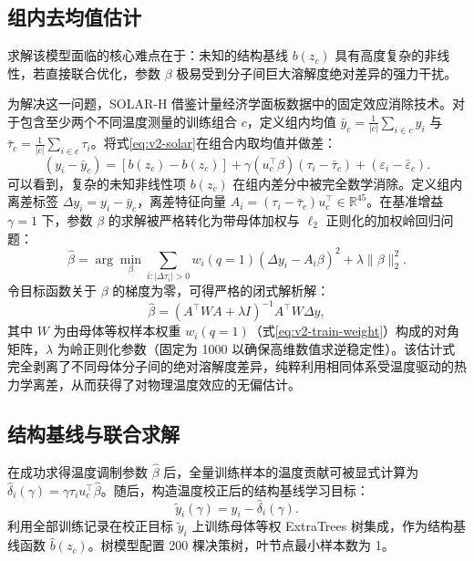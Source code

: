 \subsection{组内去均值估计}

求解该模型面临的核心难点在于：未知的结构基线 $b(z_c)$ 具有高度复杂的非线性，若直接联合优化，参数 $\beta$ 极易受到分子间巨大溶解度绝对差异的强力干扰。

为解决这一问题，SOLAR-H 借鉴计量经济学面板数据中的固定效应消除技术。对于包含至少两个不同温度测量的训练组合 $c$，定义组内均值 $\bar y_c = \frac{1}{|c|}\sum_{i \in c} y_i$ 与 $\bar\tau_c = \frac{1}{|c|}\sum_{i \in c} \tau_i$。将式\eqref{eq:v2-solar}在组合内取均值并做差：
\begin{equation}
(y_i - \bar y_c) = \left[ b(z_c) - b(z_c) \right] + \gamma (u_c^\top \beta) (\tau_i - \bar\tau_c) + (\varepsilon_i - \bar\varepsilon_c).
\end{equation}
可以看到，复杂的未知非线性项 $b(z_c)$ 在组内差分中被完全数学消除。定义组内离差标签 $\Delta y_i = y_i - \bar y_c$，离差特征向量 $A_i = (\tau_i - \bar\tau_c) u_c^\top \in \mathbb{R}^{45}$。在基准增益 $\gamma = 1$ 下，参数 $\beta$ 的求解被严格转化为带母体加权与 $\ell_2$ 正则化的加权岭回归问题：
\begin{equation}
\widehat\beta = \arg\min_\beta \sum_{i: |\Delta\tau_i| > 0} w_i(q=1) (\Delta y_i - A_i \beta)^2 + \lambda \|\beta\|_2^2.
\end{equation}
令目标函数关于 $\beta$ 的梯度为零，可得严格的闭式解析解：
\begin{equation}
\widehat\beta = (A^\top W A + \lambda I)^{-1} A^\top W \Delta y,
\end{equation}
其中 $W$ 为由母体等权样本权重 $w_i(q=1)$（式\eqref{eq:v2-train-weight}）构成的对角矩阵，$\lambda$ 为岭正则化参数（固定为 1000 以确保高维数值求逆稳定性）。该估计式完全剥离了不同母体分子间的绝对溶解度差异，纯粹利用相同体系受温度驱动的热力学离差，从而获得了对物理温度效应的无偏估计。

\subsection{结构基线与联合求解}

在成功求得温度调制参数 $\widehat\beta$ 后，全量训练样本的温度贡献可被显式计算为 $\widehat\delta_i(\gamma) = \gamma \tau_i u_c^\top \widehat\beta$。随后，构造温度校正后的结构基线学习目标：
\begin{equation}
\widetilde y_i(\gamma) = y_i - \widehat\delta_i(\gamma).
\end{equation}
利用全部训练记录在校正目标 $\widetilde y_i$ 上训练母体等权 ExtraTrees 树集成，作为结构基线函数 $\widehat b(z_c)$。树模型配置 200 棵决策树，叶节点最小样本数为 1。

